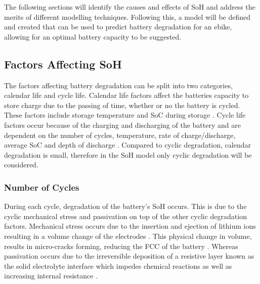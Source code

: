\documentclass[a4paper, 10pt]{article}
\numberwithin{equation}{section}
\begin{document}
The following sections will identify the causes and effects of SoH and address the merits of different modelling techniques. Following this, a model will be defined and created that can be used to predict battery degradation for an ebike, allowing for an optimal battery capacity to be suggested.

\subsection{Factors Affecting SoH} 
The factors affecting battery degradation can be split into two categories, calendar life and cycle life. Calendar life factors affect the batteries capacity to store charge due to the passing of time, whether or no the battery is cycled. These factors include storage temperature and SoC during storage \cite{report:batterypred}. Cycle life factors occur because of the charging and discharging of the battery and are dependent on the number of cycles, temperature, rate of charge/discharge, average SoC and depth of discharge \cite{report:Lam}. Compared to cyclic degradation, calendar degradation is small, therefore in the SoH model only cyclic degradation will be considered. 



\subsubsection{Number of Cycles}
During each cycle, degradation of the battery's SoH occurs. This is due to the cyclic mechanical stress and passivation on top of the other cyclic degradation factors. Mechanical stress occurs due to the insertion and ejection of lithium ions resulting in a volume change of the electrodes \cite{web:batt_life}. This physical change in volume, results in micro-cracks forming, reducing the FCC of the battery \cite{report:ageingmechs}. Whereas passivation occurs due to the irreversible deposition of a resistive layer known as the solid electrolyte interface which impedes chemical reactions as well as increasing internal resistance \cite{report:ageingmechs}.
\end{document}
